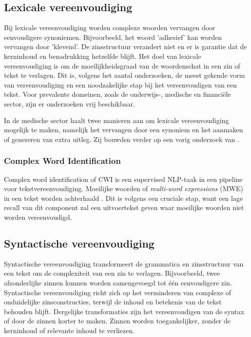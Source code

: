 \subsection{Lexicale vereenvoudiging}

Bij lexicale vereenvoudiging worden complexe woorden vervangen door eenvoudigere synoniemen. Bijvoorbeeld, het woord 'adhesief' kan worden vervangen door 'klevend'. De zinsstructuur verandert niet en er is garantie dat de kerninhoud en benadrukking hetzelfde blijft. Het doel van lexicale vereenvoudiging is om de moeilijkheidsgraad van de woordenschat in een zin of tekst te verlagen. Dit is, volgens het aantal onderzoeken, de meest gekende vorm van vereenvoudiging en een noodzakelijke stap bij het vereenvoudigen van een tekst. Voor prevalente domeinen, zoals de onderwijs-, medische en financiële sector, zijn er onderzoeken vrij beschikbaar. 

In de medische sector haalt \textcite{Kandula2010} twee manieren aan om lexicale vereenvoudiging mogelijk te maken, namelijk het vervangen door een synoniem en het aanmaken of genereren van extra uitleg. Zij bouwden verder op een vorig onderzoek van \textcite{Zeng2005}.

\subsubsection{Complex Word Identification}

Complex word identification of CWI is een supervised NLP-taak in een pipeline voor tekstvereenvoudiging. Moeilijke woorden of \textit{multi-word expressions} (MWE) in een tekst worden achterhaald  \autocite{Shardlow2013, Gooding2019}. Dit is volgens \textcite{Shardlow2013} een cruciale stap, want een lage recall van dit component zal een uitvoertekst geven waar moeilijke woorden niet worden vereenvoudigd.




\subsection{Syntactische vereenvoudiging}

Syntactische vereenvoudiging transformeert de grammatica en zinsstructuur van een tekst om de complexiteit van een zin te verlagen. Bijvoorbeeld, twee afzonderlijke zinnen kunnen worden samengevoegd tot één eenvoudigere zin. Syntactische vereenvoudiging richt zich op het verminderen van complexe of onduidelijke zinsconstructies, terwijl de inhoud en betekenis van de tekst behouden blijft. Dergelijke transformaties zijn het vereenvoudigen van de syntax of door de zinnen korter te maken. Zinnen worden toegankelijker, zonder de kerninhoud of relevante inhoud te verliezen.

